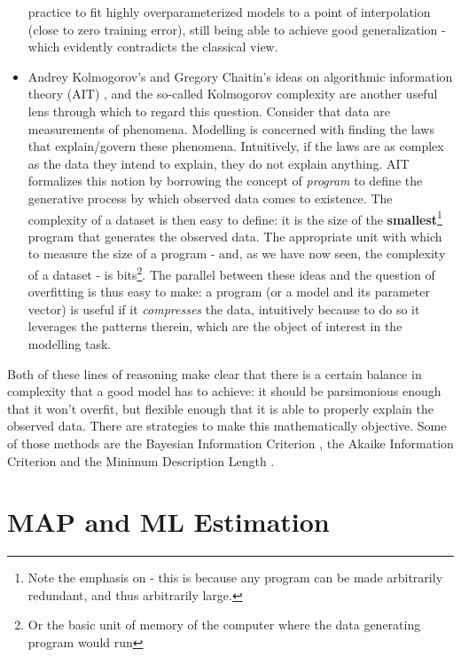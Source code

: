 \begin{itemize}
        practice to fit highly overparameterized models to a point of interpolation
        (close to zero training error), still being able to achieve good generalization -
        which evidently contradicts the classical view.
    \item Andrey Kolmogorov's and Gregory Chaitin's ideas on algorithmic information
        theory (AIT) \autocite{chaitin-leibniz}, and the so-called Kolmogorov complexity  are another
        useful lens through which to regard this question. Consider that data are
        measurements of phenomena. Modelling is concerned with finding the
        laws that explain/govern these phenomena. Intuitively, if the laws are
        as complex as the data they intend to explain, they do not explain anything.
        AIT formalizes this notion by borrowing the concept of \emph{program} to
        define the generative process by which observed data comes to existence.
        The complexity of a dataset is then easy to define: it is the size of
        the \textbf{smallest}\footnote{Note the emphasis on  - this is
        because any program can be made arbitrarily redundant, and thus arbitrarily large.}
        program that generates the observed data. The appropriate unit with
        which to measure the size of a program - and, as we have now seen, the
        complexity of a dataset - is bits\footnote{Or the basic unit of memory
        of the computer where the data generating program would run}. The parallel
        between these ideas and the question of overfitting is thus easy to make:
        a program (or a model and its parameter vector)  is useful if it 
        \emph{compresses} the data, intuitively because to do so it leverages the
        patterns therein, which are the object of interest in the modelling task.
\end{itemize}

Both of these lines of reasoning make clear that there is a certain balance
in complexity that a good model has to achieve: it should be parsimonious enough
that it won't overfit, but flexible enough that it is able to properly explain
the observed data.  There are strategies to make this mathematically objective.
Some of those methods are the Bayesian Information Criterion \autocite{bic}, the Akaike
Information Criterion \autocite{aic} and the Minimum Description Length \autocite{Lanterman_2001}.

\section{MAP and ML Estimation}
\label{section:map-mle}

